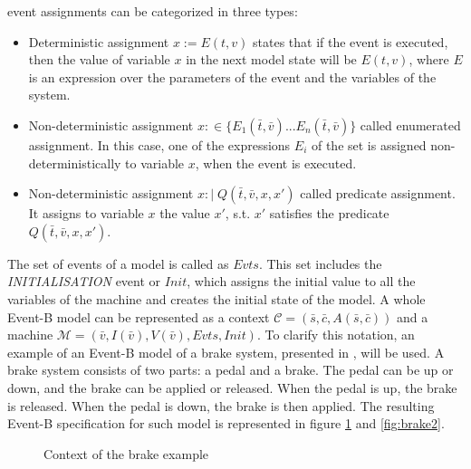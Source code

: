 event assignments can be categorized in three types:
\begin{itemize}
    \item Deterministic assignment $x := E(t,v)$ states that if the event is executed, then the value of variable $x$ in the next model state will be $E(t,v)$, where $E$ is an expression over the parameters of the event and the variables of the system.
    \item Non-deterministic assignment $x :\in  \{ E_1(\bar{t},\bar{v})... E_n(\bar{t},\bar{v}) \}$ called enumerated assignment. In this case, one of the expressions $E_i$ of the set is assigned non-deterministically to variable $x$, when the event is executed.
    \item Non-deterministic assignment $x :\! | \; Q(\bar{t}, \bar{v}, x, x')$ called predicate assignment. It assigns to variable $x$ the value $x'$, s.t. $x'$ satisfies the predicate $Q(\bar{t}, \bar{v}, x, x')$.
\end{itemize}
The set of events of a model is called as $Evts$. This set includes the \textit{INITIALISATION} event or $Init$, which assigns the initial value to all the variables of the machine and creates the initial state of the model. A whole Event-B model can be represented as a context $\mathscr{C} = (\bar{s},\bar{c}, A(\bar{s},\bar{c}))$ and a machine $\mathscr{M} =(\bar{v}, I(\bar{v}), V(\bar{v}), Evts, Init)$.
To clarify this notation, an example of an Event-B model of a brake system, presented in \cite{Aouadhi2017}, will be used. A brake system consists of two parts: a pedal and a brake. The pedal can be up or down, and the brake can be applied or released. When the pedal is up, the brake is released. When the pedal is down, the brake is then applied. The resulting Event-B specification for such model is represented in figure \ref{fig:brake1} and \ref{fig:brake2}.\begin{figure}[h]
    \centering
    \caption{Context of the brake example}
    \label{fig:brake1}
\end{figure}
